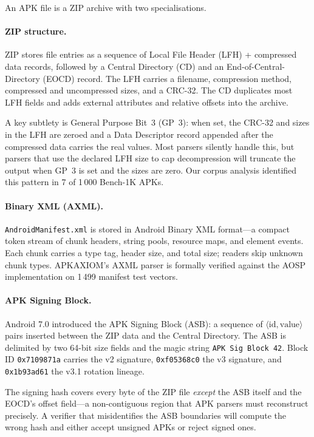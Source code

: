 \documentclass[runningheads]{llncs}
\begin{document}
An APK file is a ZIP archive with two specialisations.

\paragraph{ZIP structure.}
ZIP stores file entries as a sequence of Local File Header (LFH) + compressed
data records, followed by a Central Directory (CD) and an End-of-Central-Directory
(EOCD) record.  The LFH carries a filename, compression method, compressed and
uncompressed sizes, and a CRC-32.  The CD duplicates most LFH fields and adds
external attributes and relative offsets into the archive.

A key subtlety is General Purpose Bit~3 (GP~3): when set, the CRC-32 and sizes
in the LFH are zeroed and a Data Descriptor record appended after the compressed
data carries the real values.  Most parsers silently handle this, but parsers
that use the declared LFH size to cap decompression will truncate the output when
GP~3 is set and the sizes are zero.  Our corpus analysis identified this pattern
in 7 of 1\,000 Bench-1K APKs.

\paragraph{Binary XML (AXML).}
\texttt{AndroidManifest.xml} is stored in Android Binary XML format—a compact
token stream of chunk headers, string pools, resource maps, and element events.
Each chunk carries a type tag, header size, and total size; readers skip unknown
chunk types.  APKAXIOM's AXML parser is formally verified against the AOSP
implementation on 1\,499 manifest test vectors.

\paragraph{APK Signing Block.}
Android 7.0 introduced the APK Signing Block (ASB): a sequence of
$\langle\mathrm{id}, \mathrm{value}\rangle$ pairs inserted between the ZIP data
and the Central Directory.  The ASB is delimited by two 64-bit size fields and
the magic string \texttt{APK Sig Block 42}.  Block ID \texttt{0x7109871a} carries
the v2 signature, \texttt{0xf05368c0} the v3 signature, and \texttt{0x1b93ad61}
the v3.1 rotation lineage.

The signing hash covers every byte of the ZIP file \emph{except} the ASB itself
and the EOCD's offset field—a non-contiguous region that APK parsers must
reconstruct precisely.  A verifier that misidentifies the ASB boundaries will
compute the wrong hash and either accept unsigned APKs or reject signed ones.
\end{document}
